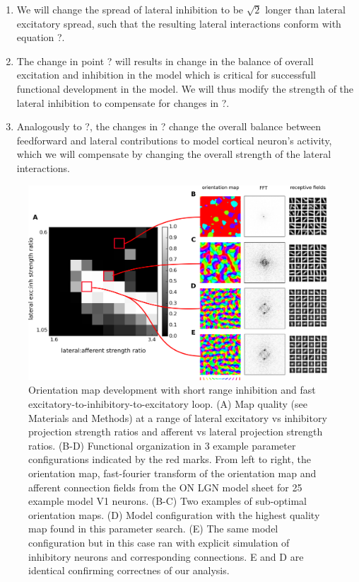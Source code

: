 \documentclass[a4paper,10pt]{article}
\begin{document}
\begin{enumerate}

\item We will change the spread of lateral inhibition to be $\sqrt{2}$ longer than lateral excitatory spread, such that the resulting lateral
interactions conform with equation ?.

\item The change in point ? will results in change in the balance of overall excitation and inhibition in the model which is critical 
for successfull functional development in the model. We will thus modify the strength of the lateral inhibition to compensate for changes in ?.

\item Analogously to ?, the changes in ? change the overall balance between feedforward and lateral contributions to model cortical neuron's activity, 
which we will compensate by changing the overall strength of the lateral interactions.

\end{enumerate} 

\begin{figure}[htpb!] 
\centering
\includegraphics[width=16cm]{./SVG/Figure1/figure1.png}
\caption{Orientation map development with short range inhibition and fast excitatory-to-inhibitory-to-excitatory loop. (A) Map quality (see Materials and Methods) at a range of 
lateral excitatory vs inhibitory projection strength ratios and afferent vs lateral projection strength ratios. (B-D) Functional organization in 3 example parameter configurations 
indicated by the red marks. From left to right, the orientation map, fast-fourier transform of the orientation map and afferent connection fields from the ON LGN model sheet for 25 example model V1 neurons. 
(B-C) Two examples of sub-optimal orientation maps. (D) Model configuration with the highest quality map found in this parameter search. (E) The same model configuration but in this case ran with explicit
simulation of inhibitory neurons and corresponding connections. E and D are identical confirming correctnes of our analysis.}
\label{fig:figure1}
\end{figure} 
\end{document}
